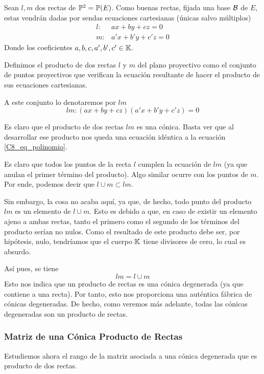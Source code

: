 Sean $l,m$ dos rectas de $\mathbb{P}^2=\mathbb{P}(E)$. Como buenas rectas, fijada una base $\mathcal{B}$ de $E$, estas vendrán dadas por sendas ecuaciones cartesianas (únicas salvo múltiplos)
\[\begin{array}{cc}
l: & ax+by+cz=0\\
m: & a'x+b'y+c'z=0
\end{array}\]
Donde los coeficientes $a,b,c,a',b',c'\in\mathbb{K}$.
\begin{defi}
	Definimos el producto de dos rectas $l$ y $m$ del plano proyectivo como el conjunto de puntos proyectivos que verifican la ecuación resultante de hacer el producto de sus ecuaciones cartesianas.
	
	A este conjunto lo denotaremos por $lm$
	\[lm:(ax+by+cz)(a'x+b'y+c'z)=0\]
\end{defi}

\begin{obs}
	\label{C8_obs_conicaProducto}
	Es claro que el producto de dos rectas $lm$ es una cónica. Basta ver que al desarrollar ese producto nos queda una ecuación idéntica a la ecuación \eqref{C8_eq_polinomio}.
\end{obs}
\begin{obs}
	\label{C8_obs_conicaProducto_union}
	Es claro que todos los puntos de la recta $l$ cumplen la ecuación de $lm$ (ya que anulan el primer término del producto). Algo similar ocurre con los puntos de $m$. Por ende, podemos decir que $l\cup m\subset lm$.
	
	Sin embargo, la cosa no acaba aquí, ya que, de hecho, todo punto del producto $lm$ es un elemento de $l\cup m$. Esto es debido a que, en caso de existir un elemento ajeno a ambas rectas, tanto el primero como el segundo de los términos del producto serían no nulos. Como el resultado de este producto debe ser, por hipótesis, nulo, tendríamos que el cuerpo $\mathbb{K}$ tiene divisores de cero, lo cual es absurdo.
	
	Así pues, se tiene
	\[lm = l\cup m\]
	Esto nos indica que un producto de rectas es una cónica degenerada (ya que contiene a una recta). Por tanto, esto nos proporciona una auténtica fábrica de cónicas degeneradas. De hecho, como veremos más adelante, todas las cónicas degeneradas son un producto de rectas.
\end{obs}
\subsubsection{Matriz de una Cónica Producto de Rectas}
Estudiemos ahora el rango de la matriz asociada a una cónica degenerada que es producto de dos rectas.

